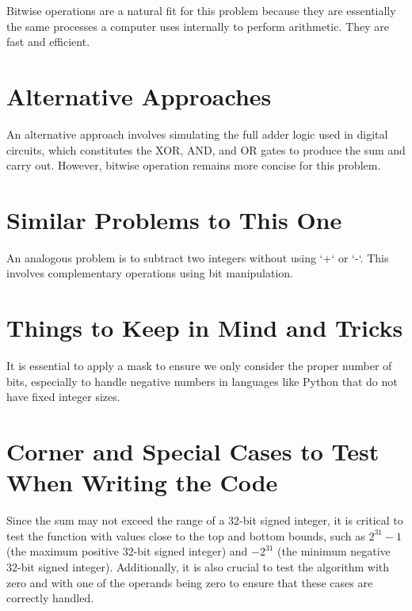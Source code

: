 Bitwise operations are a natural fit for this problem because they are essentially the same processes a computer uses internally to perform arithmetic. They are fast and efficient.

\section*{Alternative Approaches}

An alternative approach involves simulating the full adder logic used in digital circuits, which constitutes the XOR, AND, and OR gates to produce the sum and carry out. However, bitwise operation remains more concise for this problem.

\section*{Similar Problems to This One}

An analogous problem is to subtract two integers without using `+` or `-`. This involves complementary operations using bit manipulation.

\section*{Things to Keep in Mind and Tricks}

It is essential to apply a mask to ensure we only consider the proper number of bits, especially to handle negative numbers in languages like Python that do not have fixed integer sizes.

\section*{Corner and Special Cases to Test When Writing the Code}

Since the sum may not exceed the range of a 32-bit signed integer, it is critical to test the function with values close to the top and bottom bounds, such as $2^{31} - 1$ (the maximum positive 32-bit signed integer) and $-2^{31}$ (the minimum negative 32-bit signed integer). Additionally, it is also crucial to test the algorithm with zero and with one of the operands being zero to ensure that these cases are correctly handled.